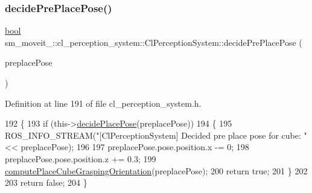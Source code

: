 \mbox{\label{classsm__moveit__4_1_1cl__perception__system_1_1ClPerceptionSystem_a027d06bc7cba5ace251a65bb29777c26}} 
\subsubsection{\texorpdfstring{decide\+Pre\+Place\+Pose()}{decidePrePlacePose()}}
{\footnotesize\ttfamily \hyperlink{classbool}{bool} sm\+\_\+moveit\+\_\+::cl\+\_\+perception\+\_\+system\+::\+Cl\+Perception\+System\+::decide\+Pre\+Place\+Pose (\begin{DoxyParamCaption}\item[{geometry\+\_\+msgs\+::\+Pose\+Stamped \&}]{preplace\+Pose }\end{DoxyParamCaption})\hspace{0.3cm}{\ttfamily [inline]}}



Definition at line 191 of file cl\+\_\+perception\+\_\+system.\+h.


\begin{DoxyCode}
192             \{
193                 \textcolor{keywordflow}{if} (this->\hyperlink{classsm__moveit__4_1_1cl__perception__system_1_1ClPerceptionSystem_af6ff9a225d451bdee312573296ed02a8}{decidePlacePose}(preplacePose))
194                 \{
195                     ROS\_INFO\_STREAM(\textcolor{stringliteral}{"[ClPerceptionSystem] Decided pre place pose for cube: "} << 
      preplacePose);
196 
197                     preplacePose.pose.position.x -= 0;
198                     preplacePose.pose.position.z += 0.3;
199                     \hyperlink{classsm__moveit__4_1_1cl__perception__system_1_1ClPerceptionSystem_afda35b6252c0a5c0692e3ff956609c23}{computePlaceCubeGraspingOrientation}(preplacePose);
200                     \textcolor{keywordflow}{return} \textcolor{keyword}{true};
201                 \}
202 
203                 \textcolor{keywordflow}{return} \textcolor{keyword}{false};
204             \}
\end{DoxyCode}
\mbox{\label{classsm__moveit__4_1_1cl__perception__system_1_1ClPerceptionSystem_a234d70a76bb5bf73f23d420c2b541632}} 
